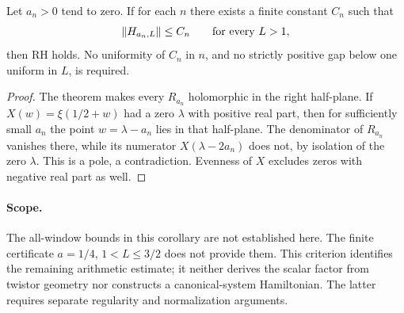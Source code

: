 \begin{corollary}
Let $a_n>0$ tend to zero.  If for each $n$ there exists a finite constant
$C_n$ such that
\[
 \|H_{a_n,L}\|\leq C_n\qquad\hbox{for every }L>1,
\]
then RH holds.  No uniformity of $C_n$ in $n$, and no strictly positive
gap below one uniform in $L$, is required.
\end{corollary}

\begin{proof}
The theorem makes every $R_{a_n}$ holomorphic in the right half-plane.
If $X(w)=\xi(1/2+w)$ had a zero $\lambda$ with positive real part,
then for sufficiently small $a_n$ the point $w=\lambda-a_n$ lies in that
half-plane.  The denominator of $R_{a_n}$ vanishes there, while its
numerator $X(\lambda-2a_n)$ does not, by isolation of the zero $\lambda$.
This is a pole, a contradiction.  Evenness of $X$ excludes zeros with
negative real part as well.
\end{proof}

\paragraph{Scope.}
The all-window bounds in this corollary are not established here.
The finite certificate $a=1/4$, $1<L\leq3/2$ does not provide them.
This criterion identifies the remaining arithmetic estimate; it neither
derives the scalar factor from twistor geometry nor constructs a
canonical-system Hamiltonian.  The latter requires separate regularity
and normalization arguments.

